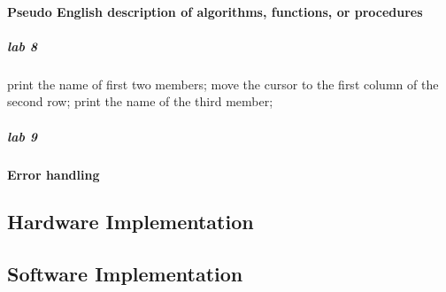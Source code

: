\paragraph{Pseudo English description of algorithms, functions, or procedures}
\subparagraph{lab 8}
print the name of first two members;
move the cursor to the first column of the second row;
print the name of the third member;
\subparagraph{lab 9}

\paragraph{Error handling}
\subsection{Hardware Implementation}
\subsection{Software Implementation}
